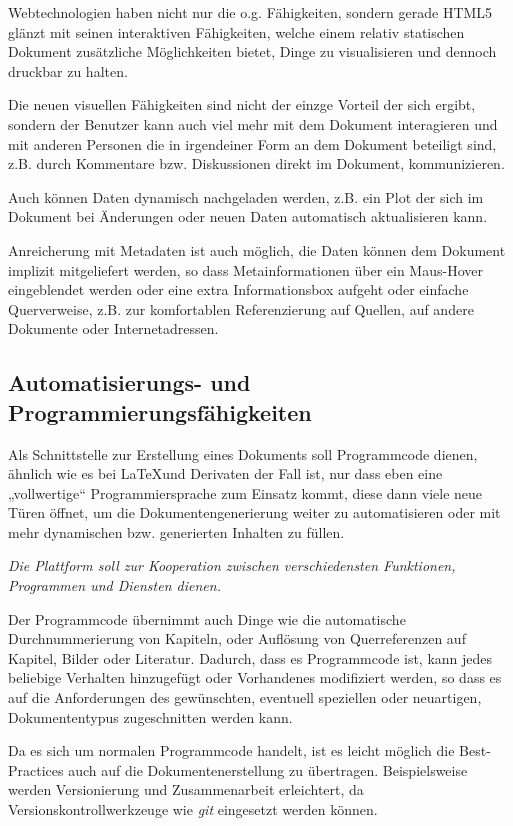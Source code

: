 Webtechnologien haben nicht nur die o.g. Fähigkeiten, sondern gerade
HTML5 glänzt mit seinen interaktiven Fähigkeiten, welche einem relativ
statischen Dokument zusätzliche Möglichkeiten bietet, Dinge zu
visualisieren und dennoch druckbar zu halten.

Die neuen visuellen Fähigkeiten sind nicht der einzge Vorteil der sich ergibt,
sondern der Benutzer kann auch viel mehr mit dem Dokument interagieren
und mit anderen Personen die in irgendeiner Form an dem Dokument beteiligt
sind, z.B. durch Kommentare bzw. Diskussionen direkt im Dokument,
kommunizieren.

Auch können Daten dynamisch nachgeladen werden, z.B. ein Plot der sich
im Dokument bei Änderungen oder neuen Daten automatisch aktualisieren kann.

Anreicherung mit Metadaten ist auch möglich, die Daten können dem Dokument
implizit mitgeliefert werden, so dass Metainformationen über ein Maus-Hover
eingeblendet werden oder eine extra Informationsbox aufgeht oder einfache
Querverweise, z.B. zur komfortablen Referenzierung auf Quellen,
auf andere Dokumente oder Internetadressen.

\subsection{Automatisierungs- und Programmierungsfähigkeiten}\label{sec-idee-szenarien}

Als Schnittstelle zur Erstellung eines Dokuments soll Programmcode
dienen, ähnlich wie es bei \LaTeX und Derivaten der Fall ist, nur
dass eben eine „vollwertige“ Programmiersprache zum Einsatz kommt, diese
dann viele neue Türen öffnet, um die Dokumentengenerierung weiter
zu automatisieren oder mit mehr dynamischen bzw. generierten Inhalten
zu füllen.

\emph{Die Plattform soll zur Kooperation zwischen verschiedensten
Funktionen, Programmen und Diensten dienen.}

Der Programmcode übernimmt auch Dinge wie die automatische Durchnummerierung
von Kapiteln, oder Auflösung von Querreferenzen auf Kapitel, Bilder oder
Literatur. Dadurch, dass es Programmcode ist, kann jedes beliebige Verhalten
hinzugefügt oder Vorhandenes modifiziert werden, so dass es auf die Anforderungen
des gewünschten, eventuell speziellen oder neuartigen, Dokumententypus
zugeschnitten werden kann.

Da es sich um normalen Programmcode handelt, ist es leicht möglich die
Best-Practices auch auf die Dokumentenerstellung zu übertragen.
Beispielsweise werden Versionierung und Zusammenarbeit erleichtert,
da Versionskontrollwerkzeuge wie \emph{git} eingesetzt werden können.

